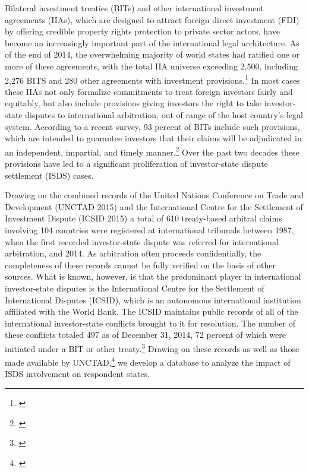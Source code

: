 \documentclass[12pt,onesided]{amsart}
\begin{document}
Bilateral investment treaties (BITs) and other international investment agreements (IIAs), which are designed to attract foreign direct investment (FDI) by offering credible property rights protection to private sector actors, have become an increasingly important part of the international legal architecture. As of the end of 2014, the overwhelming majority of world states had ratified one or more of these agreements, with the total IIA universe exceeding 2,500, including 2,276 BITS and 280 other agreements with investment provisions.\footnote{\citet{unctad:2015}} In most cases these IIAs not only formalize commitments to treat foreign investors fairly and equitably, but also include provisions giving investors the right to take investor-state disputes to international arbitration, out of range of the host country's legal system. According to a recent survey, 93 percent of BITs include such provisions, which are intended to guarantee investors that their claims will be adjudicated in an independent, impartial, and timely manner.\footnote{\citet[8]{gaukordger:gordon:2012}} Over the past two decades these provisions have led to a significant proliferation of investor-state dispute settlement (ISDS) cases.

Drawing on the combined records of the United Nations Conference on Trade and Development (UNCTAD 2015) and the International Centre for the Settlement of Investment Dispute (ICSID 2015) a total of 610 treaty-based arbitral claims involving 104 countries were registered at international tribunals between 1987, when the first recorded investor-state dispute was referred for international arbitration, and 2014. As arbitration often proceeds confidentially, the completeness of these records cannot be fully verified on the basis of other sources. What is known, however, is that the predominant player in international investor-state disputes is the International Centre for the Settlement of International Disputes (ICSID), which is an autonomous international institution affiliated with the World Bank. The ICSID maintains public records of all of the international investor-state conflicts brought to it for resolution. The number of these conflicts totaled 497 as of December 31, 2014, 72 percent of which were initiated under a BIT or other treaty.\footnote{\citet[7,10]{icsid:2015}} Drawing on these records as well as those made available by UNCTAD,\footnote{\citet{unctad:2015}} we develop a database to analyze the impact of ISDS involvement on respondent states. 
\end{document}
